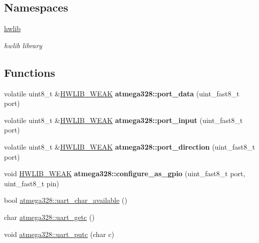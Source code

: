 \subsection*{Namespaces}
\begin{DoxyCompactItemize}
\item 
 \hyperlink{namespacehwlib}{hwlib}
\begin{DoxyCompactList}\small\item\em hwlib library \end{DoxyCompactList}\end{DoxyCompactItemize}
\subsection*{Functions}
\begin{DoxyCompactItemize}
\item 
\mbox{\label{hwlib-atmega328_8hpp_aaefc2f2daad036597659b3c9675a955f}} 
volatile uint8\+\_\+t \&\hyperlink{hwlib-defines_8hpp_a04be4340016df60d6636c1d1c6d94fc9}{H\+W\+L\+I\+B\+\_\+\+W\+E\+AK} {\bfseries atmega328\+::port\+\_\+data} (uint\+\_\+fast8\+\_\+t port)
\item 
\mbox{\label{hwlib-atmega328_8hpp_a4a3bf60471f4578ce23fff0fcef7cc2e}} 
volatile uint8\+\_\+t \&\hyperlink{hwlib-defines_8hpp_a04be4340016df60d6636c1d1c6d94fc9}{H\+W\+L\+I\+B\+\_\+\+W\+E\+AK} {\bfseries atmega328\+::port\+\_\+input} (uint\+\_\+fast8\+\_\+t port)
\item 
\mbox{\label{hwlib-atmega328_8hpp_a0692068cf4c06f6eec03a8fcb090574b}} 
volatile uint8\+\_\+t \&\hyperlink{hwlib-defines_8hpp_a04be4340016df60d6636c1d1c6d94fc9}{H\+W\+L\+I\+B\+\_\+\+W\+E\+AK} {\bfseries atmega328\+::port\+\_\+direction} (uint\+\_\+fast8\+\_\+t port)
\item 
\mbox{\label{hwlib-atmega328_8hpp_a07a1eb9c8d90a9b603f403dc274ba679}} 
void \hyperlink{hwlib-defines_8hpp_a04be4340016df60d6636c1d1c6d94fc9}{H\+W\+L\+I\+B\+\_\+\+W\+E\+AK} {\bfseries atmega328\+::configure\+\_\+as\+\_\+gpio} (uint\+\_\+fast8\+\_\+t port, uint\+\_\+fast8\+\_\+t pin)
\item 
bool \hyperlink{hwlib-atmega328_8hpp_a209a31828048372289a41def7830b7df}{atmega328\+::uart\+\_\+char\+\_\+available} ()
\item 
char \hyperlink{hwlib-atmega328_8hpp_abbb8d9f17b9d0bbed06ddfb28c2cc90f}{atmega328\+::uart\+\_\+getc} ()
\item 
void \hyperlink{hwlib-atmega328_8hpp_ac98241515514f0cb2b4bebd38cbe944b}{atmega328\+::uart\+\_\+putc} (char c)
\end{DoxyCompactItemize}


